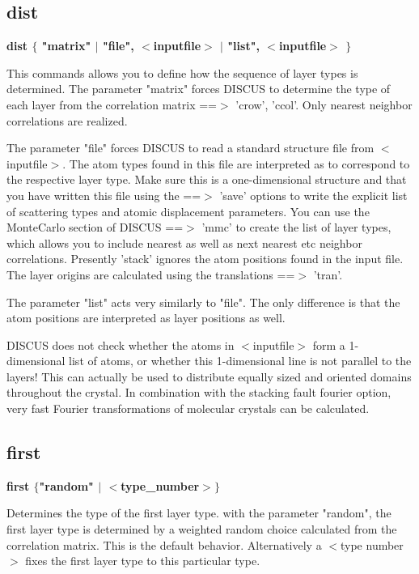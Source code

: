 \subsection*{dist}
{\bf dist $ \{$ "matrix" $| $ "file", $ <$inputfile$> $ $| $ "list", $ <$inputfile$> $ $\} $ \par }
\par
\vspace{3pt}
This commands allows you to define how the sequence of layer types 
is determined. 
The parameter "matrix" forces DISCUS to determine the type of each 
layer from the correlation matrix ==$> $ 'crow', 'ccol'. Only 
nearest neighbor correlations are realized. 
\par
The parameter "file" forces DISCUS to read a standard structure 
file from $ <$inputfile$> $. The atom types found in this file are 
interpreted as to correspond to the respective layer type. 
Make sure this is a one-dimensional structure and that you have 
written this file using the ==$> $ 'save' options to write the 
explicit list of scattering types and atomic displacement parameters. 
You can use the MonteCarlo section of DISCUS ==$> $ 'mmc' to create 
the list of layer types, which allows you to include nearest as well 
as next nearest etc neighbor correlations. 
Presently 'stack' ignores the atom positions found in the input file. 
The layer origins are calculated using the translations ==$> $ 'tran'. 
\par
The parameter "list" acts very similarly to "file". The only difference 
is that the atom positions are interpreted as layer positions as well. 
\par
DISCUS does not check whether the atoms in $ <$inputfile$> $ form a 
1-dimensional list of atoms, or whether this 1-dimensional line 
is not parallel to the layers! 
This can actually be used to distribute equally sized and oriented 
domains throughout the crystal. In combination with the stacking fault 
fourier option, very fast Fourier transformations of molecular 
crystals can be calculated. 
\subsection*{first}
{\bf first $ \{$"random" $| $ $ <$type\_number$> $$\} $ \par }
\par
\vspace{3pt}
Determines the type of the first layer type. 
with the parameter "random", the first layer type is determined by 
a weighted random choice calculated from the correlation matrix. 
This is the default behavior. 
Alternatively a $ <$type number$> $ fixes the first layer type to this 
particular type. 
